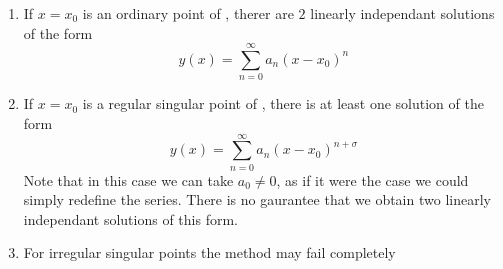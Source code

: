 \documentclass{article}
\begin{document}
\begin{thm}\leavevmode
    \begin{enumerate}[label=(\arabic*)]
        \item If $x = x_0$ is an ordinary point of , therer are $2$ linearly independant solutions of the form
        \[
            y(x) = \sum_{n=0}^{\infty} a_n (x - x_0)^n  
        \]
        \item If $x = x_0$ is a regular singular point of , there is at least one solution of the form
        \[
            y(x) = \sum_{n=0}^{\infty} a_n (x - x_0)^{n + \sigma} \tag{$a_0 \neq 0$}
        \]
        Note that in this case we can take $a_0 \neq 0$, as if it were the case we could simply redefine the series.
        There is no gaurantee that we obtain two linearly independant solutions of this form.
        \item For irregular singular points the method may fail completely
    \end{enumerate}
\end{thm}
\end{document}

